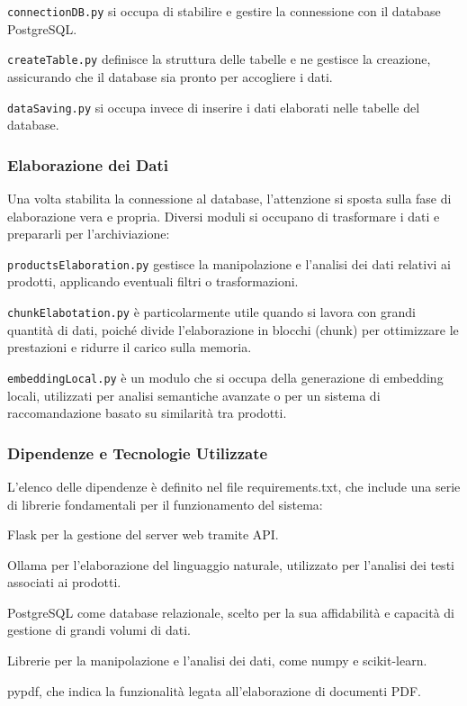 \texttt{connectionDB.py} si occupa di stabilire e gestire la connessione con il database PostgreSQL.

\texttt{createTable.py} definisce la struttura delle tabelle e ne gestisce la creazione, assicurando che il database sia pronto per accogliere i dati.

\texttt{dataSaving.py} si occupa invece di inserire i dati elaborati nelle tabelle del database.

\subsubsection{Elaborazione dei Dati}
Una volta stabilita la connessione al database, l'attenzione si sposta sulla fase di elaborazione vera e propria. Diversi moduli si occupano di trasformare i dati e prepararli per l'archiviazione:

\item \texttt{productsElaboration.py} gestisce la manipolazione e l'analisi dei dati relativi ai prodotti, applicando eventuali filtri o trasformazioni.

\item \texttt{chunkElabotation.py} è particolarmente utile quando si lavora con grandi quantità di dati, poiché divide l'elaborazione in blocchi (chunk) per ottimizzare le prestazioni e ridurre il carico sulla memoria.

\item \texttt{embeddingLocal.py} è un modulo che si occupa della generazione di embedding locali,  utilizzati per analisi semantiche avanzate o per un sistema di raccomandazione basato su similarità tra prodotti.

\subsubsection{ Dipendenze e Tecnologie Utilizzate}
\item L’elenco delle dipendenze è definito nel file requirements.txt, che include una serie di librerie fondamentali per il funzionamento del sistema:

\item Flask per la gestione del server web tramite API.

\item Ollama per l’elaborazione del linguaggio naturale,  utilizzato per l'analisi dei testi associati ai prodotti.

\item PostgreSQL come database relazionale, scelto per la sua affidabilità e capacità di gestione di grandi volumi di dati.

\item Librerie per la manipolazione e l'analisi dei dati, come numpy e scikit-learn.

\item pypdf, che indica la funzionalità legata all'elaborazione di documenti PDF.
